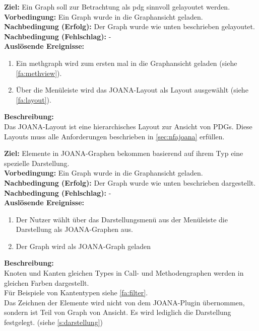 \label{fa:joanalayout}
\textbf{Ziel:} Ein Graph soll zur Betrachtung als \gls{pdg} sinnvoll gelayoutet werden.\\ %
\textbf{Vorbedingung:} Ein Graph wurde in die Graphansicht geladen.\\
\textbf{Nachbedingung (Erfolg):} Der Graph wurde wie unten beschrieben gelayoutet.\\
\textbf{Nachbedingung (Fehlschlag):} -\\
\textbf{Auslösende Ereignisse:}
\begin{enumerate}[nolistsep, label=(\alph*)]
  \item Ein \gls{methgraph} wird zum ersten mal in die Graphansicht geladen (siehe \ref{fa:methview}).
  \item Über die Menüleiste wird das JOANA-Layout als Layout ausgewählt (siehe \ref{fa:layout}).
\end{enumerate}
\textbf{Beschreibung:}\\
Das JOANA-Layout ist eine hierarchisches Layout zur Ansicht von PDGs.
Diese Layouts muss alle Anforderungen beschrieben in \ref{sec:nfajoana} erfüllen.

\label{fa:joanaview}
\textbf{Ziel:} Elemente in JOANA-Graphen bekommen basierend auf ihrem Typ eine spezielle Darstellung.\\
\textbf{Vorbedingung:} Ein Graph wurde in die Graphansicht geladen.\\
\textbf{Nachbedingung (Erfolg):} Der Graph wurde wie unten beschrieben dargestellt.\\
\textbf{Nachbedingung (Fehlschlag):} -\\
\textbf{Auslösende Ereignisse:}
\begin{enumerate}[nolistsep, label=(\alph*)]
  \item Der Nutzer wählt über das Darstellungsmenü aus der Menüleiste die Darstellung als JOANA-Graphen aus.
  \item Der Graph wird als JOANA-Graph geladen
\end{enumerate}
\textbf{Beschreibung:}\\
Knoten und Kanten gleichen Types in Call- und Methodengraphen werden in gleichen Farben dargestellt.\\
Für Beispiele von Kantentypen siehe \ref{fa:filter}.\\
Das Zeichnen der Elemente wird nicht von dem JOANA-Plugin übernommen, sondern ist Teil von Graph von Ansicht. %
Es wird lediglich die Darstellung festgelegt. (siehe \ref{s:darstellung})


